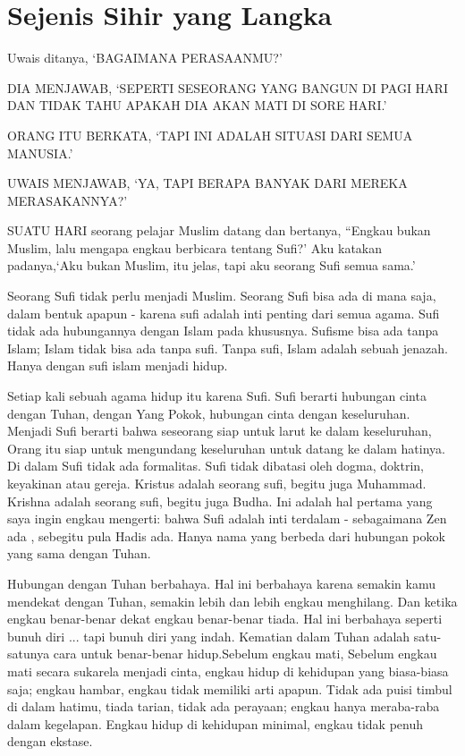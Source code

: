\chapter{Sejenis Sihir yang Langka}
Uwais ditanya, ‘BAGAIMANA PERASAANMU?’

DIA MENJAWAB, ‘SEPERTI SESEORANG YANG BANGUN DI PAGI HARI DAN TIDAK TAHU APAKAH
DIA AKAN MATI DI SORE HARI.’

ORANG ITU BERKATA, ‘TAPI INI ADALAH SITUASI DARI SEMUA MANUSIA.’

UWAIS MENJAWAB, ‘YA, TAPI BERAPA BANYAK DARI MEREKA MERASAKANNYA?’


SUATU HARI seorang pelajar Muslim datang dan bertanya, “Engkau bukan Muslim, lalu mengapa engkau berbicara tentang Sufi?’ Aku katakan padanya,‘Aku bukan Muslim, itu jelas, tapi aku seorang Sufi semua sama.’

Seorang Sufi tidak perlu menjadi Muslim. Seorang Sufi bisa ada di mana saja, dalam bentuk apapun - karena sufi adalah inti penting dari semua agama. Sufi tidak ada hubungannya dengan Islam pada khususnya. Sufisme bisa ada tanpa Islam; Islam tidak bisa ada tanpa sufi. Tanpa sufi, Islam adalah sebuah jenazah. Hanya dengan sufi islam menjadi hidup.

Setiap kali sebuah agama hidup itu karena Sufi. Sufi berarti hubungan cinta dengan Tuhan, dengan Yang Pokok, hubungan cinta dengan keseluruhan. Menjadi Sufi berarti bahwa seseorang siap untuk larut ke dalam keseluruhan, Orang itu siap untuk mengundang keseluruhan untuk datang ke dalam hatinya. Di dalam Sufi tidak ada formalitas. Sufi tidak dibatasi oleh dogma, doktrin, keyakinan atau gereja. Kristus adalah seorang sufi, begitu juga Muhammad. Krishna adalah seorang sufi, begitu juga Budha. Ini adalah hal pertama yang saya ingin engkau mengerti: bahwa Sufi  adalah inti terdalam - sebagaimana Zen ada , sebegitu pula Hadis ada. Hanya nama yang berbeda dari hubungan pokok yang sama dengan Tuhan.

Hubungan dengan Tuhan berbahaya. Hal ini berbahaya karena semakin kamu mendekat dengan Tuhan, semakin lebih dan lebih engkau menghilang. Dan ketika engkau benar-benar dekat engkau benar-benar tiada. Hal ini berbahaya seperti bunuh diri ... tapi bunuh diri yang indah. Kematian dalam Tuhan adalah satu-satunya cara untuk benar-benar hidup.Sebelum engkau mati, Sebelum engkau mati secara sukarela menjadi cinta, engkau hidup di kehidupan yang biasa-biasa saja; engkau hambar, engkau tidak memiliki arti apapun. Tidak ada puisi timbul di dalam hatimu, tiada tarian, tidak ada perayaan; engkau hanya meraba-raba dalam kegelapan. Engkau hidup di kehidupan minimal, engkau tidak penuh dengan ekstase.

